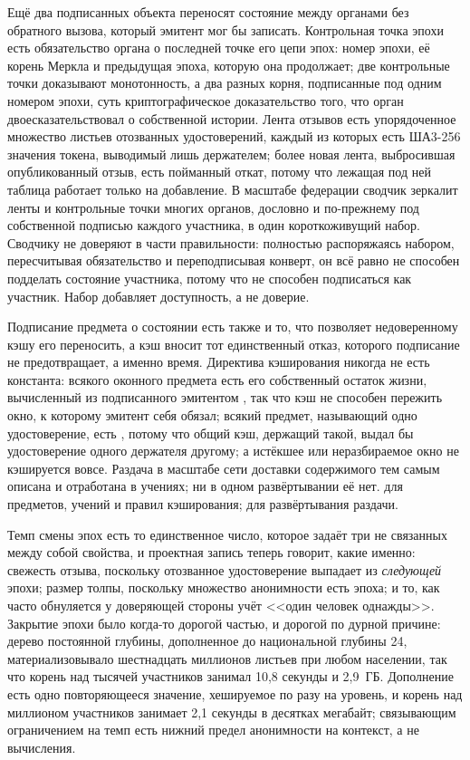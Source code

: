 Ещё два подписанных объекта переносят состояние между органами без обратного вызова, который
эмитент мог бы записать. Контрольная точка эпохи есть обязательство органа о последней точке его
цепи эпох: номер эпохи, её корень Меркла и предыдущая эпоха, которую она продолжает; две
контрольные точки доказывают монотонность, а два разных корня, подписанные под одним номером
эпохи, суть криптографическое доказательство того, что орган двоесказательствовал о собственной
истории. Лента отзывов есть упорядоченное множество листьев отозванных удостоверений, каждый из
которых есть ША3-256 значения токена, выводимый лишь держателем; более новая лента, выбросившая
опубликованный отзыв, есть пойманный откат, потому что лежащая под ней таблица работает только на
добавление. В масштабе федерации сводчик зеркалит ленты и контрольные точки многих органов,
дословно и по-прежнему под собственной подписью каждого участника, в один короткоживущий набор.
Сводчику не доверяют в части правильности: полностью распоряжаясь набором, пересчитывая
обязательство и переподписывая конверт, он всё равно не способен подделать состояние участника,
потому что не способен подписаться как участник. Набор добавляет доступность, а не доверие.
\sImpl

Подписание предмета о состоянии есть также и то, что позволяет недоверенному кэшу его переносить,
а кэш вносит тот единственный отказ, которого подписание не предотвращает, а именно время.
Директива кэширования никогда не есть константа:  всякого оконного
предмета есть его собственный остаток жизни, вычисленный из подписанного эмитентом
, так что кэш не способен пережить окно, к которому эмитент себя обязал; всякий
предмет, называющий одно удостоверение, есть , потому что общий кэш, держащий
такой, выдал бы удостоверение одного держателя другому; а истёкшее или неразбираемое окно не
кэшируется вовсе. Раздача в масштабе сети доставки содержимого тем самым описана и отработана в
учениях; ни в одном развёртывании её нет. \sImplMark{} для предметов, учений и правил кэширования;
\sFut{} для развёртывания раздачи.

Темп смены эпох есть то единственное число, которое задаёт три не связанных между собой свойства,
и проектная запись теперь говорит, какие именно: свежесть отзыва, поскольку отозванное
удостоверение выпадает из \emph{следующей} эпохи; размер толпы, поскольку множество анонимности
есть эпоха; и то, как часто обнуляется у доверяющей стороны учёт <<один человек однажды>>.
Закрытие эпохи было когда-то дорогой частью, и дорогой по дурной причине: дерево постоянной
глубины, дополненное до национальной глубины 24, материализовывало шестнадцать миллионов листьев
при любом населении, так что корень над тысячей участников занимал 10,8 секунды и 2,9~ГБ.
Дополнение есть одно повторяющееся значение, хешируемое по разу на уровень, и
корень над миллионом участников занимает 2,1 секунды в десятках мегабайт; связывающим ограничением
на темп есть нижний предел анонимности на контекст, а не вычисления. \sImpl

